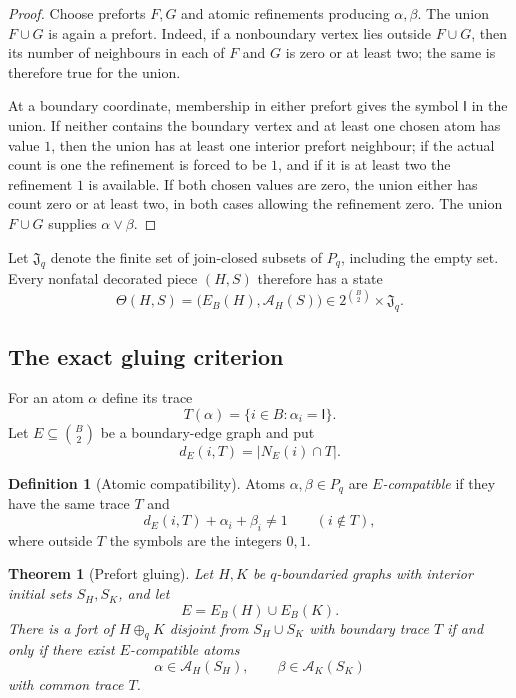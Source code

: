 \documentclass[11pt,reqno]{amsart}
\newtheorem{theorem}{Theorem}[section]
\theoremstyle{definition}
\newtheorem{definition}[definition]{Definition}
\begin{document}
\begin{proof}
Choose preforts $F,G$ and atomic refinements producing $\alpha,\beta$.
The union $F\cup G$ is again a prefort.  Indeed, if a nonboundary vertex lies
outside $F\cup G$, then its number of neighbours in each of $F$ and $G$ is
zero or at least two; the same is therefore true for the union.

At a boundary coordinate, membership in either prefort gives the symbol
$\mathsf I$ in the union.  If neither contains the boundary vertex and at
least one chosen atom has value $1$, then the union has at least one interior
prefort neighbour; if the actual count is one the refinement is forced to be
$1$, and if it is at least two the refinement $1$ is available.  If both
chosen values are zero, the union either has count zero or at least two, in
both cases allowing the refinement zero.  The union $F\cup G$ supplies
$\alpha\vee\beta$.
\end{proof}

Let $\mathfrak J_q$ denote the finite set of join-closed subsets of $P_q$,
including the empty set.  Every nonfatal decorated piece $(H,S)$ therefore has
a state
\[
  \Theta(H,S)=\bigl(E_B(H),\mathcal A_H(S)\bigr)
  \in 2^{\binom B2}\times\mathfrak J_q.
\]

\subsection{The exact gluing criterion}

For an atom $\alpha$ define its trace
\[
 T(\alpha)=\{i\in B:\alpha_i=\mathsf I\}.
\]
Let $E\subseteq\binom B2$ be a boundary-edge graph and put
\[
 d_E(i,T)=|N_E(i)\cap T|.
\]

\begin{definition}[Atomic compatibility]\label{def:atomic-compatible}
Atoms $\alpha,\beta\in P_q$ are \emph{$E$-compatible} if they have the same
trace $T$ and
\begin{equation}\label{eq:atomic-compatibility}
 d_E(i,T)+\alpha_i+\beta_i\ne1
 \qquad(i\notin T),
\end{equation}
where outside $T$ the symbols are the integers $0,1$.
\end{definition}

\begin{theorem}[Prefort gluing]\label{thm:prefort-gluing}
Let $H,K$ be $q$-boundaried graphs with interior initial sets $S_H,S_K$, and
let
\[
 E=E_B(H)\cup E_B(K).
\]
There is a fort of $H\oplus_qK$ disjoint from
$S_H\cup S_K$ with boundary trace $T$ if and only if there exist
$E$-compatible atoms
\[
 \alpha\in\mathcal A_H(S_H),\qquad
 \beta\in\mathcal A_K(S_K)
\]
with common trace $T$.
\end{theorem}
\end{document}

